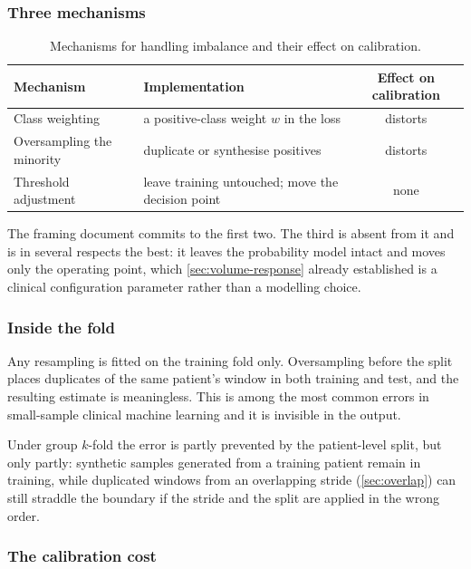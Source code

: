 \documentclass[12pt,a4paper,oneside]{report}
\begin{document}
\subsubsection{Three mechanisms}

\begin{table}[htbp]
\centering\small
\caption{Mechanisms for handling imbalance and their effect on calibration.}\label{tab:imbalance-mechanisms}
\begin{tabularx}{\textwidth}{@{}>{\raggedright\arraybackslash}p{3.6cm} X c@{}}
\toprule
\textbf{Mechanism} & \textbf{Implementation} & \textbf{Effect on calibration} \\
\midrule
Class weighting & a positive-class weight $w$ in the loss & distorts \\
Oversampling the minority & duplicate or synthesise positives & distorts \\
Threshold adjustment & leave training untouched; move the decision point & none \\
\bottomrule
\end{tabularx}
\end{table}

The framing document commits to the first two. The third is absent from it and is in several respects the best: it leaves the probability model intact and moves only the operating point, which \cref{sec:volume-response} already established is a clinical configuration parameter rather than a modelling choice.

\subsubsection{Inside the fold}

Any resampling is fitted on the training fold only. Oversampling before the split places duplicates of the same patient's window in both training and test, and the resulting estimate is meaningless. This is among the most common errors in small-sample clinical machine learning and it is invisible in the output.

Under group $k$-fold the error is partly prevented by the patient-level split, but only partly: synthetic samples generated from a training patient remain in training, while duplicated windows from an overlapping stride (\cref{sec:overlap}) can still straddle the boundary if the stride and the split are applied in the wrong order.

\subsubsection{The calibration cost}
\end{document}
